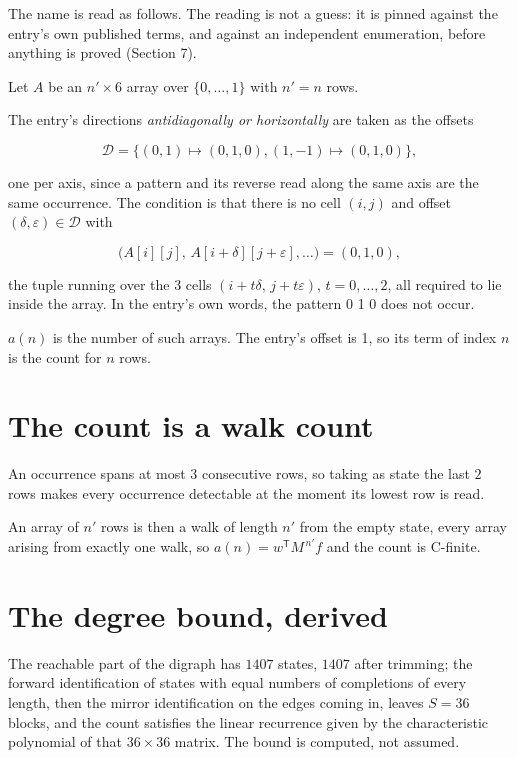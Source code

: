 \documentclass[11pt]{article}
\theoremstyle{definition}
\begin{document}
The name is read as follows. The reading is not a guess: it is pinned against the entry's own published terms, and against an independent enumeration, before anything is proved (Section 7).

Let $A$ be an $n' \times 6$ array over $\{0,\dots,1\}$ with $n' = n$ rows.

The entry's directions {\itshape antidiagonally or horizontally} are taken as the offsets

\[\mathcal{D} = \{(0,1)\mapsto(0,1,0), (1,-1)\mapsto(0,1,0)\},\]

one per axis, since a pattern and its reverse read along the same axis are the same occurrence. The condition is that there is no cell $(i,j)$ and offset $(\delta,\varepsilon)\in\mathcal{D}$ with

\[\bigl(A[i][j],\,A[i{+}\delta][j{+}\varepsilon],\dots\bigr) = (0, 1, 0),\]

the tuple running over the $3$ cells $(i+t\delta,\,j+t\varepsilon)$, $t = 0,\dots,2$, all required to lie inside the array. In the entry's own words, the pattern 0 1 0 does not occur.

$a(n)$ is the number of such arrays. The entry's offset is 1, so its term of index $n$ is the count for $n$ rows.

\section{The count is a walk count}

An occurrence spans at most $3$ consecutive rows, so taking as state the last $2$ rows makes every occurrence detectable at the moment its lowest row is read.

An array of $n'$ rows is then a walk of length $n'$ from the empty state, every array arising from exactly one walk, so $a(n) = w^{\mathsf T}M^{\,n'}f$ and the count is C-finite.

\section{The degree bound, derived}

The reachable part of the digraph has $1407$ states, $1407$ after trimming; the forward identification of states with equal numbers of completions of every length, then the mirror identification on the edges coming in, leaves $S = 36$ blocks, and the count satisfies the linear recurrence given by the characteristic polynomial of that $36\times36$ matrix. The bound is computed, not assumed.
\end{document}
